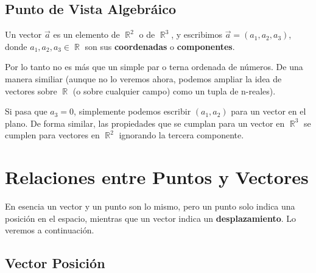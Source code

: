 \documentclass[12pt, fleqn]{report}                             %
\DeclareMathOperator \Reals        {\mathbb{R}}                 %
\begin{document}
            \subsection{Punto de Vista Algebráico}
            
                Un vector $\vec{a}$ es un elemento de $\Reals^2$ o de $\Reals^3$, y escribimos
                $\vec{a} = (a_1, a_2, a_3)$, donde $a_1, a_2, a_3 \in \Reals$ son sus
                \textbf{coordenadas} o \textbf{componentes}.

                Por lo tanto no es más que un simple par o terna ordenada de números. 
                De una manera similiar (aunque no lo veremos ahora, podemos ampliar la idea de vectores
                sobre $\Reals$ (o sobre cualquier campo) como un tupla de n-reales).

                Si pasa que $a_3 = 0$, simplemente podemos escribir $(a_1, a_2)$ para un vector en el plano.
                De forma similar, las propiedades que se cumplan para un vector en $\Reals^3$ se
                cumplen para vectores en $\Reals^2$ ignorando la tercera componente.

            
        \clearpage
        \section{Relaciones entre Puntos y Vectores}
        
            En esencia un vector y un punto son lo mismo, pero un punto solo indica una posición
            en el espacio, mientras que un vector indica un \textbf{desplazamiento}.
            Lo veremos a continuación.
            
            \subsection{Vector Posición}
            
\end{document}
